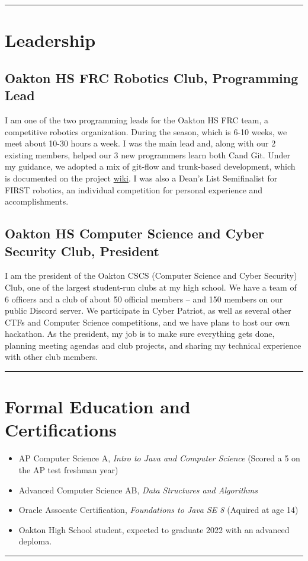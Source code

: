 \documentclass[10pt,letterpaper]{article}
\def\link#1#2{\color{blue!60!black}\href{#1}{#2}\color{black}}
\newcommand{\CPP}
{C\nolinebreak[4]\hspace{-.05em}\raisebox{.35ex}{\footnotesize\bf ++}}
\def\paddedItem#1{\vspace{-0.4em}\item #1}
\begin{document}
    \hrule
    \vspace{-0.4em}

    \section*{Leadership}
    \subsection*{Oakton HS FRC Robotics Club, Programming Lead}

    I am one of the two programming leads for the Oakton HS FRC team,
    a competitive robotics organization.
    During the season, which is 6-10 weeks, we meet about 10-30 hours a week.
    I was the main lead and, along with our 2 existing members,
    helped our 3 new programmers learn both \CPP and Git.
    Under my guidance, we adopted a mix of git-flow and trunk-based development,
    which is documented on the project \link{https://github.com/CougarProgramming623/InfiniteRecharge/wiki/Git}{wiki}.
    I was also a Dean's List Semifinalist for FIRST robotics,
    an individual competition for personal experience and accomplishments.

    \subsection*{Oakton HS Computer Science and Cyber Security Club, President}

    I am the president of the Oakton CSCS (Computer Science and Cyber Security) Club,
    one of the largest student-run clubs at my high school. 
    We have a team of 6 officers and a club of about 50 official members -- and 150 members on our public Discord server.
    We participate in Cyber Patriot, as well as several other CTFs and Computer Science competitions,
    and we have plans to host our own hackathon.
    As the president, my job is to make sure everything gets done, planning meeting agendas and club projects,
    and sharing my technical experience with other club members. 

    \vspace{1em}
    \hrule

    \section*{Formal Education and Certifications}
    \begin{itemize}
        \paddedItem AP Computer Science A, \textit{Intro to Java and Computer Science}  (Scored a 5 on the AP test freshman year)
        \paddedItem Advanced Computer Science AB, \textit{Data Structures and Algorithms}
        \paddedItem Oracle Assocate Certification, \textit{Foundations to Java SE 8} (Aquired at age 14)
        \paddedItem Oakton High School student, expected to graduate 2022 with an advanced deploma.
    \end{itemize}
    \vspace{0.3em}
    \hrule
    
\end{document}
